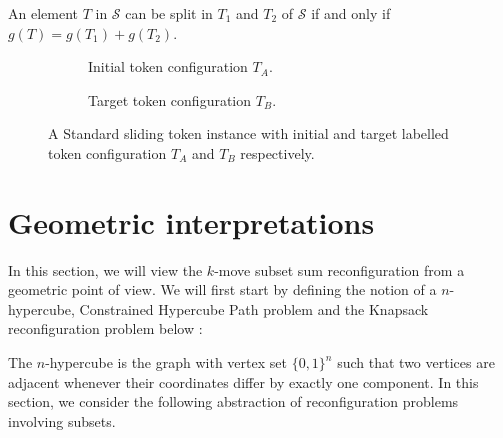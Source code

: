 \begin{example}
An element $T$ in $\mathcal{S}$ can be split in $T_1$ and $T_2$ of $\mathcal{S}$ if and only if $g(T) = g(T_1) + g(T_2)$.
\begin{figure}[H]
  \centering
  \begin{subfigure}[b]{0.4\textwidth}
    \begin{scaletikzpicturetowidth}{\textwidth}
    \end{scaletikzpicturetowidth}
    \caption{Initial token configuration $T_{A}$.}
    \label{fig:standard_1}
  \end{subfigure}
  \begin{subfigure}[b]{0.4\textwidth}
    \begin{scaletikzpicturetowidth}{\textwidth}
    \end{scaletikzpicturetowidth}
    \caption{Target token configuration $T_{B}$.}
    \label{fig:standard_2}
  \end{subfigure}
  \caption{A Standard sliding token instance with initial and target labelled token configuration $T_{A}$ and $T_{B}$ respectively.}
  \label{fig:input_instance_standard}
\end{figure}

\end{example}


\section{Geometric interpretations}
In this section, we will view the $k$-move subset sum reconfiguration from a geometric point of view.
We will first start by defining the notion of a $n$-hypercube, Constrained Hypercube Path problem and the Knapsack reconfiguration
problem below :

The $n$-hypercube is the graph with vertex set $\{0, 1\}^n$ such that two vertices are adjacent whenever their coordinates differ by
exactly one component. In this section, we consider the following abstraction of reconfiguration problems involving subsets.

